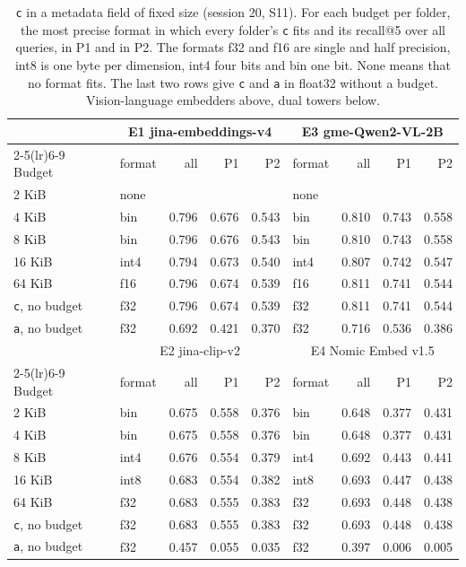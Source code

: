 \documentclass[11pt]{article}
\newcommand{\rep}[1]{\texttt{#1}}
\begin{document}
\begin{table}[t]
\centering\small
\caption{\rep{c} in a metadata field of fixed size (session 20, S11). For each budget per folder, the most precise format in which every folder's \rep{c} fits and its recall@5 over all queries, in P1 and in P2. The formats f32 and f16 are single and half precision, int8 is one byte per dimension, int4 four bits and bin one bit. None means that no format fits. The last two rows give \rep{c} and \rep{a} in float32 without a budget. Vision-language embedders above, dual towers below.}
\label{tab:bytes}
\begin{tabular}{llrrrlrrr}
\toprule
& \multicolumn{4}{c}{E1 jina-embeddings-v4} & \multicolumn{4}{c}{E3 gme-Qwen2-VL-2B} \\
\cmidrule(lr){2-5}\cmidrule(lr){6-9}
Budget & format & all & P1 & P2 & format & all & P1 & P2 \\
\midrule
2 KiB & none & & & & none & & & \\
4 KiB & bin & 0.796 & 0.676 & 0.543 & bin & 0.810 & 0.743 & 0.558 \\
8 KiB & bin & 0.796 & 0.676 & 0.543 & bin & 0.810 & 0.743 & 0.558 \\
16 KiB & int4 & 0.794 & 0.673 & 0.540 & int4 & 0.807 & 0.742 & 0.547 \\
64 KiB & f16 & 0.796 & 0.674 & 0.539 & f16 & 0.811 & 0.741 & 0.544 \\
\rep{c}, no budget & f32 & 0.796 & 0.674 & 0.539 & f32 & 0.811 & 0.741 & 0.544 \\
\rep{a}, no budget & f32 & 0.692 & 0.421 & 0.370 & f32 & 0.716 & 0.536 & 0.386 \\
\midrule
& \multicolumn{4}{c}{E2 jina-clip-v2} & \multicolumn{4}{c}{E4 Nomic Embed v1.5} \\
\cmidrule(lr){2-5}\cmidrule(lr){6-9}
Budget & format & all & P1 & P2 & format & all & P1 & P2 \\
\midrule
2 KiB & bin & 0.675 & 0.558 & 0.376 & bin & 0.648 & 0.377 & 0.431 \\
4 KiB & bin & 0.675 & 0.558 & 0.376 & bin & 0.648 & 0.377 & 0.431 \\
8 KiB & int4 & 0.676 & 0.554 & 0.379 & int4 & 0.692 & 0.443 & 0.441 \\
16 KiB & int8 & 0.683 & 0.554 & 0.382 & int8 & 0.693 & 0.447 & 0.438 \\
64 KiB & f32 & 0.683 & 0.555 & 0.383 & f32 & 0.693 & 0.448 & 0.438 \\
\rep{c}, no budget & f32 & 0.683 & 0.555 & 0.383 & f32 & 0.693 & 0.448 & 0.438 \\
\rep{a}, no budget & f32 & 0.457 & 0.055 & 0.035 & f32 & 0.397 & 0.006 & 0.005 \\
\bottomrule
\end{tabular}
\end{table}
\end{document}
